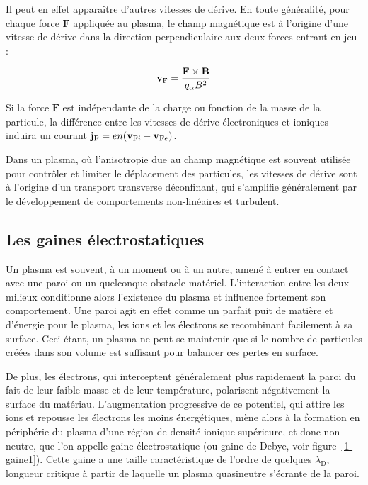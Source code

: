 \begin{refsection}
Il peut en effet apparaître d'autres vitesses de dérive. En toute généralité, 
pour chaque force $\mathbf F$ appliquée au plasma, le champ magnétique est à
l'origine d'une vitesse de dérive dans la direction perpendiculaire aux deux
forces entrant en jeu :

\begin{equation}
\mathbf{v}{_{\text{F}}}=\frac{\mathbf{F}\times\mathbf{B}}{q_\alpha B^2}
\end{equation}

Si la force $\mathbf F$ est indépendante de la charge ou
fonction de la masse de la particule, la différence entre les vitesses de dérive
électroniques et ioniques induira un courant $\mathbf
j{_{\text{F}}}=en(\mathbf v{_{\text{F}{i}}}-\mathbf
v{_{\text{F}{e}}})$. 

Dans un plasma, où l'anisotropie due au champ
magnétique est souvent utilisée pour contrôler et limiter le déplacement des
particules, les vitesses de dérive sont à l'origine d'un transport
 transverse déconfinant, qui s'amplifie généralement par le développement de
 comportements non-linéaires et turbulent.
 
\subsection{Les gaines électrostatiques}
\label{1-gaines}
Un plasma est souvent, à un moment ou à un autre, amené à entrer en contact avec
une paroi ou un quelconque obstacle matériel. L'interaction entre
les deux milieux conditionne alors l'existence du plasma et influence
fortement son comportement. Une paroi agit en effet comme un parfait
puit de matière et d'énergie pour le plasma, les ions et les électrons se
recombinant facilement à sa surface. Ceci étant, un plasma ne peut se maintenir
que si le nombre de particules créées dans son volume est suffisant pour
balancer ces pertes en surface. 

De plus, les électrons, qui interceptent généralement
plus rapidement la paroi du fait de leur faible masse et de leur température,
polarisent négativement la surface du matériau.
L'augmentation progressive de ce potentiel, qui attire les ions et repousse les
électrons les moins énergétiques, mène alors à la formation en périphérie du
plasma d'une région de densité ionique supérieure, et donc non-neutre, que l'on
appelle gaine électrostatique (ou gaine de Debye, voir figure~\ref{1-gaine1}).
Cette gaine a une taille caractéristique de l'ordre de quelques
$\lambda_\text{D}$, longueur critique à partir de laquelle un plasma
quasineutre s'écrante de la paroi.


\end{refsection}
